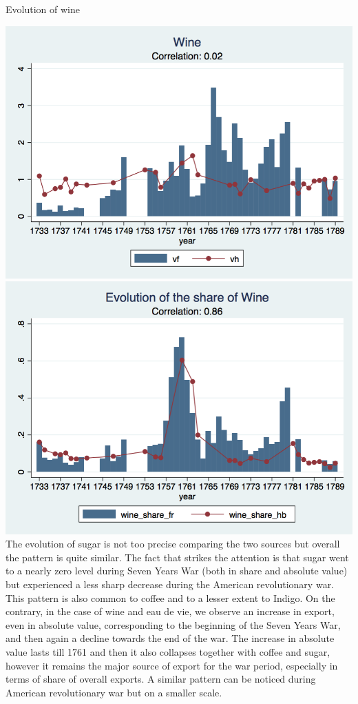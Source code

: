 \documentclass[12pt,a4paper,titlepage,english]{article}
\begin{document}
\caption{Evolution of wine}
\includegraphics[scale=.28]{wine_long.png}
\includegraphics[scale=.28]{wine_share_long.png}
The evolution of sugar is not too precise comparing the two sources but overall the pattern is quite similar. The fact that strikes the attention is that sugar went to a nearly zero level during Seven Years War (both in share and absolute value) but experienced a less sharp decrease during the American revolutionary war. This pattern is also common to coffee and to a lesser extent to Indigo. On the contrary, in the case of wine and eau de vie, we observe an increase in export, even in absolute value, corresponding to the beginning of the Seven Years War, and then again a decline towards the end of the war. The increase in absolute value lasts till 1761 and then it also collapses together with coffee and sugar, however it remains the major source of export for the war period, especially in terms of share of overall exports. A similar pattern can be noticed during American revolutionary war but on a smaller scale. 
\end{document}
